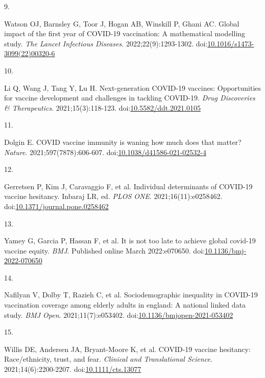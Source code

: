 \documentclass[
]{article}
\newlength{\cslhangindent}
\newlength{\csllabelwidth}
\newlength{\cslentryspacingunit} %
\newenvironment{CSLReferences}[2] %
 {%
  \setlength{\parindent}{0pt}
  \ifodd #1
  \let\oldpar\par
  \def\par{\hangindent=\cslhangindent\oldpar}
  \fi
  \setlength{\parskip}{#2\cslentryspacingunit}
 }%
 {}
\newcommand{\CSLLeftMargin}[1]{\parbox[t]{\csllabelwidth}{#1}}
\newcommand{\CSLRightInline}[1]{\parbox[t]{\linewidth - \csllabelwidth}{#1}\break}
\begin{document}
\begin{CSLReferences}{0}{0}
\leavevmode{}%
\CSLLeftMargin{9. }%
\CSLRightInline{Watson OJ, Barnsley G, Toor J, Hogan AB, Winskill P,
Ghani AC. Global impact of the first year of {COVID}-19 vaccination: A
mathematical modelling study. \emph{The Lancet Infectious Diseases}.
2022;22(9):1293-1302.
doi:\href{https://doi.org/10.1016/s1473-3099(22)00320-6}{10.1016/s1473-3099(22)00320-6}}

\leavevmode{}%
\CSLLeftMargin{10. }%
\CSLRightInline{Li Q, Wang J, Tang Y, Lu H. Next-generation COVID-19
vaccines: Opportunities for vaccine development and challenges in
tackling COVID-19. \emph{Drug Discoveries \& Therapeutics}.
2021;15(3):118-123.
doi:\href{https://doi.org/10.5582/ddt.2021.0105}{10.5582/ddt.2021.0105}}

\leavevmode{}%
\CSLLeftMargin{11. }%
\CSLRightInline{Dolgin E. {COVID} vaccine immunity is waning
{\textemdash} how much does that matter? \emph{Nature}.
2021;597(7878):606-607.
doi:\href{https://doi.org/10.1038/d41586-021-02532-4}{10.1038/d41586-021-02532-4}}

\leavevmode{}%
\CSLLeftMargin{12. }%
\CSLRightInline{Gerretsen P, Kim J, Caravaggio F, et al. Individual
determinants of {COVID}-19 vaccine hesitancy. Inbaraj LR, ed.
\emph{{PLOS} {ONE}}. 2021;16(11):e0258462.
doi:\href{https://doi.org/10.1371/journal.pone.0258462}{10.1371/journal.pone.0258462}}

\leavevmode{}%
\CSLLeftMargin{13. }%
\CSLRightInline{Yamey G, Garcia P, Hassan F, et al. It is not too late
to achieve global covid-19 vaccine equity. \emph{{BMJ}}. Published
online March 2022:e070650.
doi:\href{https://doi.org/10.1136/bmj-2022-070650}{10.1136/bmj-2022-070650}}

\leavevmode{}%
\CSLLeftMargin{14. }%
\CSLRightInline{Nafilyan V, Dolby T, Razieh C, et al. Sociodemographic
inequality in {COVID}-19 vaccination coverage among elderly adults in
england: A national linked data study. \emph{{BMJ} Open}.
2021;11(7):e053402.
doi:\href{https://doi.org/10.1136/bmjopen-2021-053402}{10.1136/bmjopen-2021-053402}}

\leavevmode{}%
\CSLLeftMargin{15. }%
\CSLRightInline{Willis DE, Andersen JA, Bryant-Moore K, et al.
{COVID}-19 vaccine hesitancy: Race/ethnicity, trust, and fear.
\emph{Clinical and Translational Science}. 2021;14(6):2200-2207.
doi:\href{https://doi.org/10.1111/cts.13077}{10.1111/cts.13077}}


\end{CSLReferences}
\end{document}
